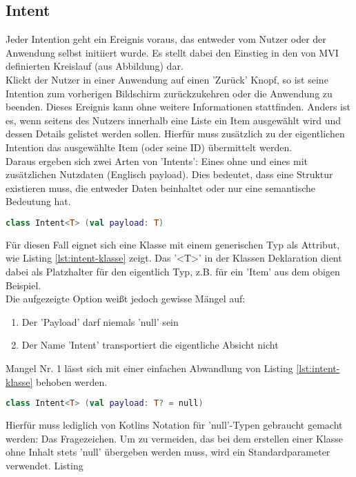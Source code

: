 \subsection{Intent}
Jeder Intention geht ein Ereignis voraus, das entweder vom Nutzer oder der Anwendung selbst initiiert wurde. Es stellt dabei den Einstieg in den von MVI definierten Kreislauf (aus Abbildung) dar. 
\\
Klickt der Nutzer in einer Anwendung auf einen 'Zurück' Knopf, so ist seine Intention zum vorherigen Bildschirm zurückzukehren oder die Anwendung zu beenden. Dieses Ereignis kann ohne weitere Informationen stattfinden. Anders ist es, wenn seitens des Nutzers innerhalb eine Liste ein Item ausgewählt wird und dessen Details gelistet werden sollen. Hierfür muss zusätzlich zu der eigentlichen Intention das ausgewählte Item (oder seine ID) übermittelt werden.
\\
Daraus ergeben sich zwei Arten von 'Intents': Eines ohne und eines mit zusätzlichen Nutzdaten (Englisch payload). Dies bedeutet, dass eine Struktur existieren muss, die entweder Daten beinhaltet oder nur eine semantische Bedeutung hat.
\begin{lstlisting}[caption={Intent Klasse}, label={lst:intent-klasse}, language=Kotlin]
class Intent<T> (val payload: T)
\end{lstlisting}
\bigskip
Für diesen Fall eignet sich eine Klasse mit einem generischen Typ als Attribut, wie Listing
\ref{lst:intent-klasse}
zeigt. Das '<T>' in der Klassen Deklaration dient dabei als Platzhalter für den eigentlich Typ, z.B. für ein 'Item' aus dem obigen Beispiel.
\\
Die aufgezeigte Option weißt jedoch gewisse Mängel auf:
\begin{enumerate}
	\item Der 'Payload' darf niemals 'null' sein
	\item Der Name 'Intent' transportiert die eigentliche Absicht nicht
\end{enumerate}
\bigskip
Mangel Nr. 1 lässt sich mit einer einfachen Abwandlung von Listing
\ref{lst:intent-klasse}
behoben werden. 
\begin{lstlisting}[caption={Intent Klasse}, label={lst:intent-klasse-2}, language=Kotlin]
class Intent<T> (val payload: T? = null)
\end{lstlisting}
\bigskip
Hierfür muss lediglich von Kotlins Notation für 'null'-Typen gebraucht gemacht werden: Das Fragezeichen. Um zu vermeiden, das bei dem erstellen einer Klasse ohne Inhalt stets 'null' übergeben werden muss, wird ein Standardparameter verwendet. Listing
